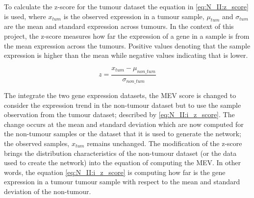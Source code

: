 To calculate the z-score for the tumour dataset the equation in \cref{eq:N_II:z_score} is used, where $x_{tum}$ is the observed expression in a tumour sample, $\mu_{tum}$ and $\sigma_{tum}$ are the mean and standard expression across tumours. In the context of this project, the z-score measures how far the expression of a gene in a sample is from the mean expression across the tumours. Positive values denoting that the sample expression is higher than the mean while negative values indicating that is lower.


\begin{equation} \label{eq:N_II:i_z_score}
z = \frac{x_{tum} - \mu_{non\_tum}}{\sigma_{non\_tum}}
\end{equation}

The integrate the two gene expression datasets, the MEV score is changed to consider the expression trend in the non-tumour dataset but to use the sample observation from the tumour dataset; described by \cref{eq:N_II:i_z_score}. The change occurs at the mean and standard deviation which are now computed for the non-tumour samples or the dataset that it is used to generate the network; the observed samples, $x_{tum}$ remains unchanged. The modification of the z-score brings the distribution characteristics of the non-tumour dataset (or the data used to create the network) into the equation of computing the MEV. In other words, the equation \cref{eq:N_II:i_z_score} is computing how far is the gene expression in a tumour tumour sample with respect to the mean and standard deviation of the non-tumour.



